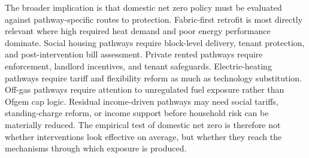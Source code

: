 The broader implication is that domestic net zero policy must be evaluated against pathway-specific routes to protection. Fabric-first retrofit is most directly relevant where high required heat demand and poor energy performance dominate. Social housing pathways require block-level delivery, tenant protection, and post-intervention bill assessment. Private rented pathways require enforcement, landlord incentives, and tenant safeguards. Electric-heating pathways require tariff and flexibility reform as much as technology substitution. Off-gas pathways require attention to unregulated fuel exposure rather than Ofgem cap logic. Residual income-driven pathways may need social tariffs, standing-charge reform, or income support before household risk can be materially reduced. The empirical test of domestic net zero is therefore not whether interventions look effective on average, but whether they reach the mechanisms through which exposure is produced.
